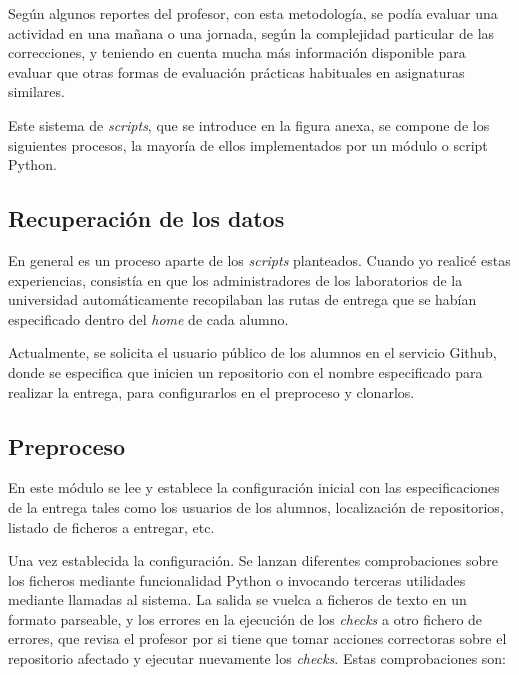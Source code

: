 Según algunos reportes del profesor, con esta metodología, se podía evaluar una actividad en una mañana o una jornada, según la complejidad particular de las correcciones, y teniendo en cuenta mucha más información disponible para evaluar que otras formas de evaluación prácticas habituales en asignaturas similares.


Este sistema de \textit{scripts}, que se introduce en la figura anexa, se compone de los siguientes procesos, la mayoría de ellos implementados por un módulo o script Python.


\subsection{Recuperación de los datos}
\label{sec:rec_datos}


En general es un proceso aparte de los \textit{scripts} planteados. Cuando yo realicé estas experiencias, consistía en que los administradores de los laboratorios de la universidad automáticamente recopilaban las rutas de entrega que se habían especificado dentro del \textit{home} de cada alumno.


Actualmente, se solicita el usuario público de los alumnos en el servicio Github, donde se especifica que inicien un repositorio con el nombre especificado para realizar la entrega, para configurarlos en el preproceso y clonarlos.



\subsection{Preproceso}
\label{sec:preproceso}


En este módulo se lee y establece la configuración inicial con las especificaciones de la entrega tales como los usuarios de los alumnos, localización de repositorios, listado de ficheros a entregar, etc.


Una vez establecida la configuración. Se lanzan diferentes comprobaciones sobre los ficheros mediante funcionalidad Python o invocando terceras utilidades mediante llamadas al sistema. La salida se vuelca a ficheros de texto en un formato parseable, y los errores en la ejecución de los \textit{checks} a otro fichero de errores, que revisa el profesor por si tiene que tomar acciones correctoras sobre el repositorio afectado y ejecutar nuevamente los \textit{checks}. Estas comprobaciones son:


